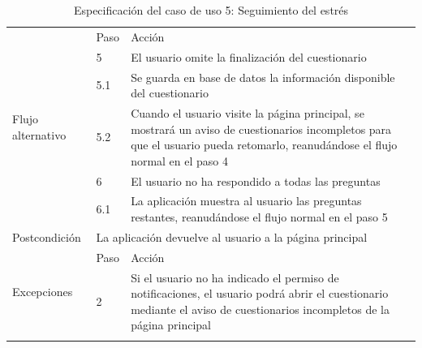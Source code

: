 \begin{table}[h]
\begin{tabularx}{\textwidth}{|l|l|X|}
            \hline
            \multirow{6}{*}{Flujo alternativo} & Paso & Acción \\
            \cline{2-3} & 5 & El usuario omite la finalización del cuestionario \\
            \cline{2-3} & 5.1 & Se guarda en base de datos la información disponible del cuestionario \\
            \cline{2-3} & 5.2 & Cuando el usuario visite la página principal, se mostrará un aviso de cuestionarios incompletos para que el usuario pueda retomarlo, reanudándose el flujo normal en el paso 4 \\
            \cline{2-3} & 6 & El usuario no ha respondido a todas las preguntas \\
            \cline{2-3} & 6.1 & La aplicación muestra al usuario las preguntas restantes, reanudándose el flujo normal en el paso 5 \\
            \hline
            Postcondición & \multicolumn{2}{|X|}{La aplicación devuelve al usuario a la página principal} \\
            \hline
            \multirow{2}{*}{Excepciones}  & Paso & Acción \\
            \cline{2-3} & 2 & Si el usuario no ha indicado el permiso de notificaciones, el usuario podrá abrir el cuestionario mediante el aviso de cuestionarios incompletos de la página principal \\
            \hline
            \caption{Especificación del caso de uso 5: Seguimiento del estrés}
            \label{tabla:casos_uso:seguimiento_estres}
        \end{tabularx}
    \end{table}

